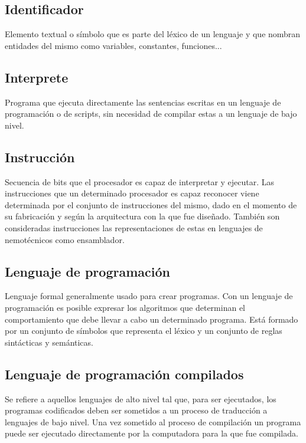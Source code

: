 \subsection{Identificador}
Elemento textual o símbolo que es parte del léxico de un lenguaje y que nombran entidades del mismo como variables, constantes, funciones...\\

\subsection{Interprete}
Programa que ejecuta directamente las sentencias escritas en un lenguaje de programación o de scripts, sin necesidad de compilar estas a un lenguaje de 
bajo nivel. \\

\subsection{Instrucción}
Secuencia de bits que el procesador es capaz de interpretar y ejecutar. Las instrucciones que un determinado procesador es capaz reconocer 
viene determinada por el conjunto de instrucciones del mismo, dado en el momento de su fabricación y según la arquitectura con la que fue diseñado. 
También son consideradas instrucciones las representaciones de estas en lenguajes de nemotécnicos como ensamblador.\\

\subsection{Lenguaje de programación}
Lenguaje formal generalmente usado para crear programas. Con un lenguaje de programación es posible expresar los 
algoritmos que determinan el comportamiento que debe llevar a cabo un determinado programa. Está formado por
un conjunto de símbolos que representa el léxico y un conjunto de reglas sintácticas y semánticas. \\

\subsection{Lenguaje de programación compilados}
Se refiere a aquellos lenguajes de alto nivel tal que, para ser ejecutados, los programas codificados deben ser sometidos a un proceso 
de traducción a lenguajes de bajo nivel. Una vez sometido al proceso de compilación un programa puede ser ejecutado directamente por 
la computadora para la que fue compilada.  \\

